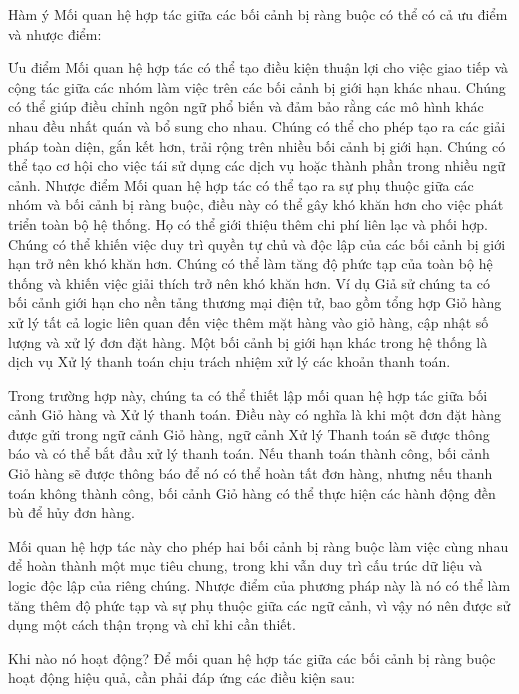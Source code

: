 Hàm ý
Mối quan hệ hợp tác giữa các bối cảnh bị ràng buộc có thể có cả ưu điểm và nhược điểm:

Ưu điểm
Mối quan hệ hợp tác có thể tạo điều kiện thuận lợi cho việc giao tiếp và cộng tác giữa các nhóm làm việc trên các bối cảnh bị giới hạn khác nhau.
Chúng có thể giúp điều chỉnh ngôn ngữ phổ biến và đảm bảo rằng các mô hình khác nhau đều nhất quán và bổ sung cho nhau.
Chúng có thể cho phép tạo ra các giải pháp toàn diện, gắn kết hơn, trải rộng trên nhiều bối cảnh bị giới hạn.
Chúng có thể tạo cơ hội cho việc tái sử dụng các dịch vụ hoặc thành phần trong nhiều ngữ cảnh.
Nhược điểm
Mối quan hệ hợp tác có thể tạo ra sự phụ thuộc giữa các nhóm và bối cảnh bị ràng buộc, điều này có thể gây khó khăn hơn cho việc phát triển toàn bộ hệ thống.
Họ có thể giới thiệu thêm chi phí liên lạc và phối hợp.
Chúng có thể khiến việc duy trì quyền tự chủ và độc lập của các bối cảnh bị giới hạn trở nên khó khăn hơn.
Chúng có thể làm tăng độ phức tạp của toàn bộ hệ thống và khiến việc giải thích trở nên khó khăn hơn.
Ví dụ
Giả sử chúng ta có bối cảnh giới hạn cho nền tảng thương mại điện tử, bao gồm tổng hợp Giỏ hàng xử lý tất cả logic liên quan đến việc thêm mặt hàng vào giỏ hàng, cập nhật số lượng và xử lý đơn đặt hàng. Một bối cảnh bị giới hạn khác trong hệ thống là dịch vụ Xử lý thanh toán chịu trách nhiệm xử lý các khoản thanh toán.

Trong trường hợp này, chúng ta có thể thiết lập mối quan hệ hợp tác giữa bối cảnh Giỏ hàng và Xử lý thanh toán. Điều này có nghĩa là khi một đơn đặt hàng được gửi trong ngữ cảnh Giỏ hàng, ngữ cảnh Xử lý Thanh toán sẽ được thông báo và có thể bắt đầu xử lý thanh toán. Nếu thanh toán thành công, bối cảnh Giỏ hàng sẽ được thông báo để nó có thể hoàn tất đơn hàng, nhưng nếu thanh toán không thành công, bối cảnh Giỏ hàng có thể thực hiện các hành động đền bù để hủy đơn hàng.

Mối quan hệ hợp tác này cho phép hai bối cảnh bị ràng buộc làm việc cùng nhau để hoàn thành một mục tiêu chung, trong khi vẫn duy trì cấu trúc dữ liệu và logic độc lập của riêng chúng. Nhược điểm của phương pháp này là nó có thể làm tăng thêm độ phức tạp và sự phụ thuộc giữa các ngữ cảnh, vì vậy nó nên được sử dụng một cách thận trọng và chỉ khi cần thiết.

Khi nào nó hoạt động?
Để mối quan hệ hợp tác giữa các bối cảnh bị ràng buộc hoạt động hiệu quả, cần phải đáp ứng các điều kiện sau:

